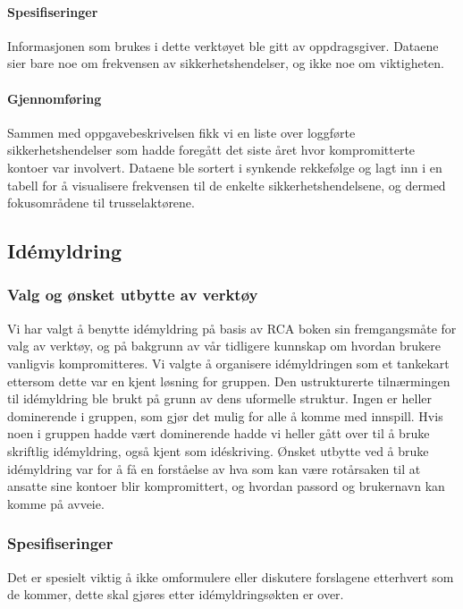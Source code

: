 \paragraph{Spesifiseringer}
Informasjonen som brukes i dette verktøyet ble gitt av oppdragsgiver. Dataene sier bare noe om frekvensen av sikkerhetshendelser, og ikke noe om viktigheten.

\paragraph{Gjennomføring}
Sammen med oppgavebeskrivelsen fikk vi en liste over loggførte sikkerhetshendelser som hadde foregått det siste året hvor kompromitterte kontoer var involvert. Dataene ble sortert i synkende rekkefølge og lagt inn i en tabell for å visualisere frekvensen til de enkelte sikkerhetshendelsene, og dermed fokusområdene til trusselaktørene. 


\subsection{Idémyldring}

\subsubsection{Valg og ønsket utbytte av verktøy}
Vi har valgt å benytte idémyldring på basis av RCA boken \cite{RCA} sin fremgangsmåte for valg av verktøy, og på bakgrunn av vår tidligere kunnskap om hvordan brukere vanligvis kompromitteres. Vi valgte å organisere idémyldringen som et tankekart ettersom dette var en kjent løsning for gruppen. Den ustrukturerte tilnærmingen til idémyldring ble brukt på grunn av dens uformelle struktur. Ingen er heller dominerende i gruppen, som gjør det mulig for alle å komme med innspill. Hvis noen i gruppen hadde vært dominerende hadde vi heller gått over til å bruke skriftlig idémyldring, også kjent som idéskriving. Ønsket utbytte ved å bruke idémyldring var for å få en forståelse av hva som kan være rotårsaken til at ansatte sine kontoer blir kompromittert, og hvordan passord og brukernavn kan komme på avveie. 

\subsubsection{Spesifiseringer}
Det er spesielt viktig å ikke omformulere eller diskutere forslagene etterhvert som de kommer, dette skal gjøres etter idémyldringsøkten er over.

